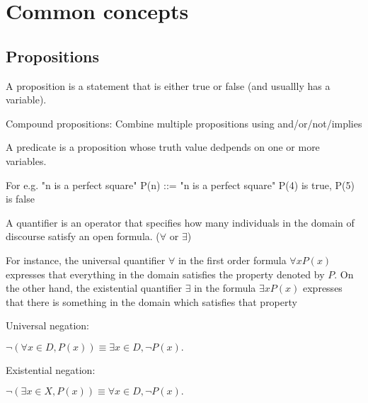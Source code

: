\chapter{Common concepts}




\section{Propositions}

\begin{definition}[Proposition]
	A proposition is a statement that is either true or false (and usuallly has a variable).
\end{definition}

\begin{definition}
	Compound propositions: Combine multiple propositions using and/or/not/implies
\end{definition}


\begin{definition}[Predicate]
	A predicate is a proposition whose truth value dedpends on one or more variables.
\end{definition}

For e.g.
	"n is a perfect square"
	P(n) ::= "n is a perfect square"
	P(4) is true, P(5) is false
	
\begin{definition}[Quantifier]
A quantifier is an operator that specifies how many individuals in the domain of discourse satisfy an open formula. ($\forall$ or $\exists$)
\end{definition}

For instance, the universal quantifier $\forall$  in the first order formula ${ \forall xP(x)}$ expresses that everything in the domain satisfies the property denoted by $P$. On the other hand, the existential quantifier ${ \exists }$ in the formula ${ \exists xP(x)}$ expresses that there is something in the domain which satisfies that property

\begin{lemma}
	Universal negation: 
	\begin{center}
	$ \neg (\forall x \in D, P(x)) \equiv \exists x \in D, \neg P(x). $
	\end{center}

	Existential negation:
	\begin{center}
	$ \neg{(\exists x \in X, P(x))} \equiv \forall x \in D, \neg P(x). $
	\end{center}
\end{lemma}

